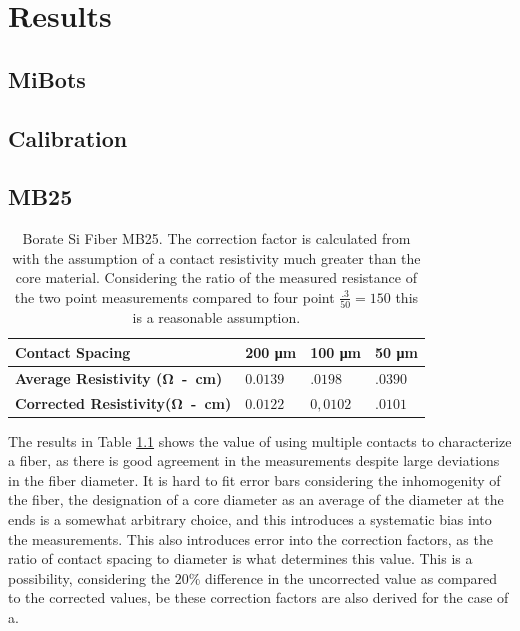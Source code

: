 \chapter{Results}


\section{MiBots}
\section{Calibration }
\section{MB25}
\begin{table}[!h]
\begin{center}
\begin{tabular}{ | l | l | l | l |}
\hline
\textbf{Contact Spacing}&\textbf{200 \si{\micro \meter}} & \textbf{100 \si{\micro \meter}} & \textbf{50 \si{\micro \meter}} \\ \hline
\textbf{Average Resistivity (\si{\ohm - \cm})}&$0.0139$& $.0198$&$.0390$\\\hline
\textbf{Corrected Resistivity(\si{\ohm - \cm})}&0$.0122$& $0,0102$ &$.0101$\\\hline
\end{tabular}
\end{center}
\caption{Borate Si Fiber MB25. The correction factor is calculated from \cite{Zimney2007CorrectionStudy} with the assumption of a contact resistivity much greater than the core material. Considering the ratio of the measured resistance of the two point measurements compared to four point $\frac{.3}{50} = 150 $ this is a reasonable assumption.}
\label{Tabmb25}
\end{table}

The results in Table \ref{Tabmb25} shows the value of using multiple contacts to characterize a fiber, as there is good agreement in the measurements despite large deviations in the fiber diameter. It is hard to fit error bars considering the inhomogenity of the fiber, the designation of a core diameter as an average of the diameter at the ends is a somewhat arbitrary choice, and this introduces a systematic bias into the measurements. This also introduces error into the correction factors, as the ratio of contact spacing to diameter is what determines this value. This is a possibility, considering the $20\%$ difference in the uncorrected value as compared to the corrected values, be these correction factors are also derived for the case of a. 

